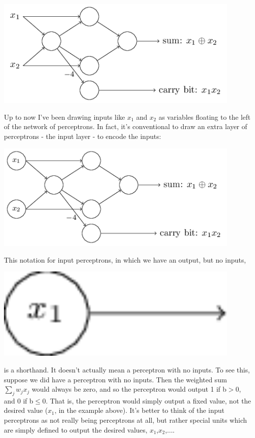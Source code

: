 {\centering
\includegraphics[width=0.9\textwidth,]{pic/perceptronadder02}
\par}

Up to now I've been drawing inputs like $x_1$ and $x_2$ as variables floating to the left of the network of perceptrons. In fact, it's conventional to draw an extra layer of perceptrons - the input layer - to encode the inputs: 


{\centering
\includegraphics[width=0.9\textwidth,]{pic/perceptronadder03}
\par}

This notation for input perceptrons, in which we have an output, but no inputs, 

{\centering
\includegraphics[width=0.9\textwidth,]{pic/inputnode}
\par}

is a shorthand. It doesn't actually mean a perceptron with no inputs. To see this, suppose we did have a perceptron with no inputs. Then the weighted sum $\sum_{j} w_{j} x_{j}$ would always be zero, and so the perceptron would output 1 if b$>$0, and 0 if b$\leq$0. That is, the perceptron would simply output a fixed value, not the desired value ($x_1$, in the example above). It's better to think of the input perceptrons as not really being perceptrons at all, but rather special units which are simply defined to output the desired values, $x_1$,$x_2$,$\ldots$.



